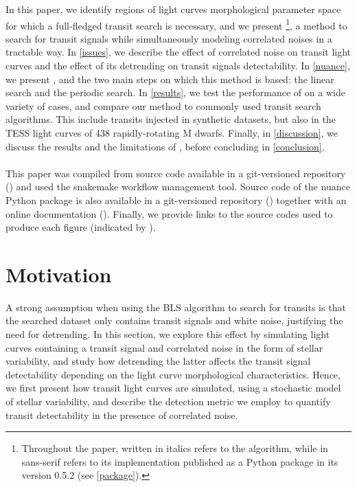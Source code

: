 \documentclass[modern]{aastex631}
\begin{document}
\newpage
In this paper, we identify regions of light curves morphological parameter space for which a full-fledged transit search is necessary, and we present \nuancemethod{}\footnote{Throughout the paper, \nuancemethod{} written in italics refers to the algorithm, while \nuancecode{} in sans-serif refers to its implementation published as a Python package in its version 0.5.2 (see \autoref{package}).}, a method to search for transit signals while simultaneously modeling correlated noises in a tractable way. In \autoref{issues}, we describe the effect of correlated noise on transit light curves and the effect of its detrending on transit signals detectability. In \autoref{nuance}, we present \nuance{}, and the two main steps on which this method is based: the linear search and the periodic search. In \autoref{results}, we test the performance of \nuance{} on a wide variety of cases, and compare our method to commonly used transit search algorithms. This include transits injected in synthetic datasets, but also in the TESS light curves of 438 rapidly-rotating M dwarfs. Finally, in \autoref{discussion}, we discuss the results and the limitations of \nuance{}, before concluding in \autoref{conclusion}.\\\\
This paper was compiled from source code available in a git-versioned repository (\href{https://github.com/lgrcia/paper-nuance}{\color{linkcolor}\faFileTextO}) and used the \textsf{snakemake} workflow management tool. Source code of the \textsf{nuance} \textsf{Python} package is also available in a git-versioned repository (\href{https://github.com/lgrcia/nuance}{\color{linkcolor}\faCode}) together with an online documentation (\href{https://nuance.readthedocs.io}{\color{linkcolor}\faBook}). Finally, we provide links to the source codes used to produce each figure (indicated by {\color{linkcolor}\codeicon}).

\newpage
\section{Motivation}\label{issues}
A strong assumption when using the BLS algorithm to search for transits is that the searched dataset only contains transit signals and white noise, justifying the need for detrending. In this section, we explore this effect by simulating light curves containing a transit signal and correlated noise in the form of stellar variability, and study how detrending the latter affects the transit signal detectability depending on the light curve morphological characteristics. Hence, we first present how transit light curves are simulated, using a stochastic model of stellar variability, and describe the detection metric we employ to quantify transit detectability in the presence of correlated noise.
\end{document}
